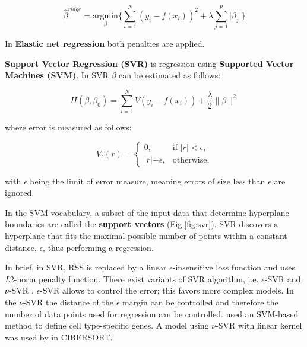 \documentclass[12pt,]{book}
\theoremstyle{definition}
\theoremstyle{definition}
\theoremstyle{definition}
\theoremstyle{remark}
\begin{document}
\begin{equation}
\hat{\beta}^{ridge} = \underset{\beta}{\text{argmin}}\{\sum_{i = 1}^{N}(y_i - f(x_i))^2 + \lambda\sum_{j=1}^{p}\lvert\beta_j\rvert\}\label{eq:lasso}
\end{equation}

In \textbf{Elastic net regression} both penalties are applied.

\textbf{Support Vector Regression (SVR)} is regression using
\textbf{Supported Vector Machines (SVM)}. In SVR \(\beta\) can be
estimated as follows:

\begin{equation}
H(\beta,\beta_0) = \sum_{i=1}^{N} V (y_i − f(x_i)) +\frac{λ}2\lVert\beta\rVert^2 \label{eq:svr1}
\end{equation}

where error is measured as follows:

\begin{equation}
V_\epsilon(r) = \begin{cases}
    0, & \text{if $\lvert r \rvert < \epsilon$,}\\
    \rvert r\lvert - \epsilon, & \text{otherwise}.
  \end{cases}  \label{eq:svr2}
\end{equation}

with \(\epsilon\) being the limit of error measure, meaning errors of
size less than \(\epsilon\) are ignored.

In the SVM vocabulary, a subset of the input data that determine
hyperplane boundaries are called the \textbf{support vectors}
(Fig.\ref{fig:svr}). SVR discovers a hyperplane that fits the maximal
possible number of points within a constant distance, \(\epsilon\), thus
performing a regression.

In brief, in SVR, RSS is replaced by a linear \(\epsilon\)-insensitive
loss function and uses \emph{L}2-norm penalty function. There exist
variants of SVR algorithm, i.e. \(\epsilon\)-SVR \citep{drucker1997} and
\(\nu\)-SVR \citep{Scholkopf2000}. \(\epsilon\)-SVR allows to control
the error; this favors more complex models. In the \(\nu\)-SVR the
distance of the \(\epsilon\) margin can be controlled and therefore the
number of data points used for regression can be controlled.
\citet{Ju2013} used an SVM-based method to define cell type-specific
genes. A model using \(\nu\)-SVR with linear kernel was used by
\citet{Newman2015} in CIBERSORT.
\end{document}
